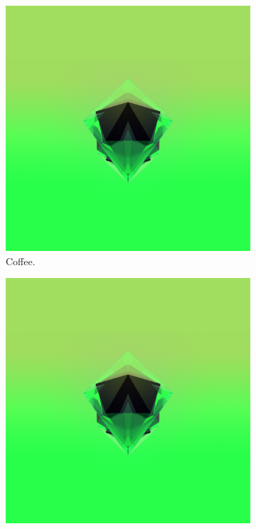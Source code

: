 \documentclass{article}
\begin{document}
\begin{figure}[t!]
  \centering
  \begin{subfigure}[b]{0.3\linewidth}
    \includegraphics[width=\linewidth]{test.jpg}
     \caption{Coffee.}
  \end{subfigure}
  \begin{subfigure}[b]{0.3\linewidth}
    \includegraphics[width=\linewidth]{test.jpg}

\end{subfigure}
\end{figure}
\end{document}

